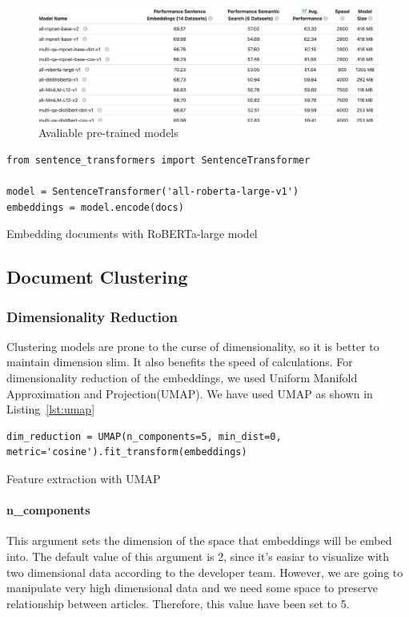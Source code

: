 \documentclass[sigconf,authorversion,nonacm]{acmart}
\begin{document}
\begin{figure}[ht]
    \includegraphics[width=\linewidth]{img/avail.png}
    \caption{Avaliable pre-trained models}
    \label{fig:avail}
\end{figure}

\begin{listing}[ht]
\begin{verbatim}
from sentence_transformers import SentenceTransformer

model = SentenceTransformer('all-roberta-large-v1')
embeddings = model.encode(docs)
\end{verbatim}
\caption{Embedding documents with RoBERTa-large model}
\label{lst:embed}
\end{listing}

\subsection{Document Clustering}
\subsubsection{Dimensionality Reduction}
Clustering models are prone to the curse of dimensionality, so
it is better to maintain dimension slim. It also benefits the speed of
calculations.
For dimensionality reduction of the embeddings,
we used Uniform Manifold Approximation and Projection(UMAP).
We have used UMAP as shown in Listing~\ref{lst:umap}

\begin{listing}[ht]
\begin{verbatim}
dim_reduction = UMAP(n_components=5, min_dist=0, metric='cosine').fit_transform(embeddings)
\end{verbatim}
\caption{Feature extraction with UMAP}
\label{lst:umap}
\end{listing}

\paragraph{n\_components}
This argument sets the dimension of the space that embeddings will be embed into.
The default value of this argument is 2,
since it's easiar to visualize with two dimensional data according to the developer team.
However, we are going to manipulate very high dimensional data
and we need some space to preserve relationship between articles.
Therefore, this value have been set to 5.
\end{document}
